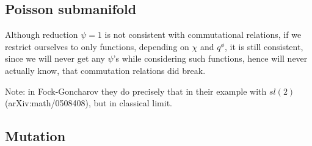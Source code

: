 \documentclass{paper}
\def\be{\begin{eqnarray}}
\def\ee{\end{eqnarray}}
\def\lb{\left (}
\def\rb{\right )}
\def\lsb{\left [}
\def\rsb{\right ]}
\def\tx{\tilde{x}}
\def\ty{\tilde{y}}
\def\tw{\tilde{w}}
\newcommand{\delabel}[1]{(\ref{#1})}
\begin{document}






\subsection{Poisson submanifold}
Although reduction $\psi = 1$ is not consistent with commutational relations, if we
restrict ourselves to only functions, depending on $\chi$ and $q^\phi$, it is still consistent,
since we will never get any $\psi$'s while considering such functions, hence will never actually
know, that commutation relations did break.

Note: in Fock-Goncharov they do precisely that in their example with $sl(2)$ (arXiv:math/0508408),
but in classical limit.

\subsection{Mutation}
\end{document}
